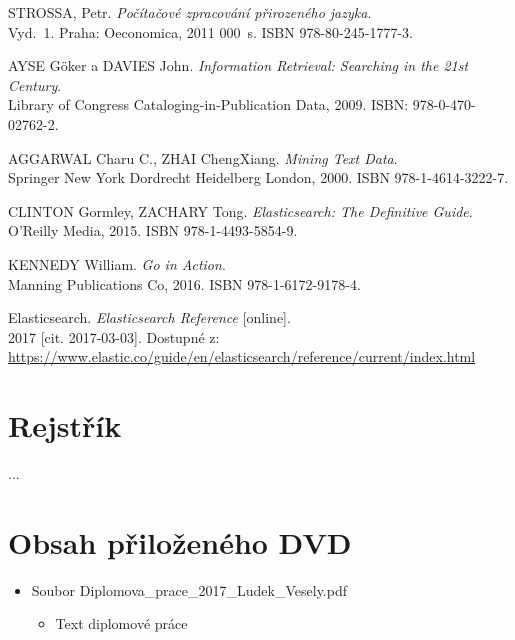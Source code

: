 \documentclass[FM,DP]{tulthesis}
\begin{document}
\begin{thebibliography}{Mm99}

 STROSSA, Petr. \emph{Počítačové zpracování přirozeného jazyka}. \\
Vyd.~1. Praha: Oeconomica, 2011 000~s. ISBN 978-80-245-1777-3. %

 AYSE Göker a DAVIES John. \emph{Information Retrieval: Searching in the 21st Century}. \\
Library of Congress Cataloging-in-Publication Data, 2009. ISBN: 978-0-470-02762-2. %

 AGGARWAL Charu C., ZHAI ChengXiang. \emph{Mining Text Data}. \\
Springer New York Dordrecht Heidelberg London, 2000. ISBN 978-1-4614-3222-7. %

 CLINTON Gormley, ZACHARY Tong. \emph{Elasticsearch: The Definitive Guide}. \\
O'Reilly Media, 2015. ISBN 978-1-4493-5854-9. %

 KENNEDY William. \emph{Go in Action}. \\
Manning Publications Co, 2016. ISBN 978-1-6172-9178-4. %

 Elasticsearch. \emph{Elasticsearch Reference} [online]. \\
2017 [cit. 2017-03-03]. Dostupné z:\\
\url{https://www.elastic.co/guide/en/elasticsearch/reference/current/index.html}

\end{thebibliography}


\chapter*{Rejstřík}
...


\appendix

\chapter{Obsah přiloženého DVD}

\begin{itemize}
\item Soubor Diplomova\_prace\_2017\_Ludek\_Vesely.pdf
\begin{itemize}
	\item Text diplomové práce
\end{itemize}

\end{itemize}




\end{document}
